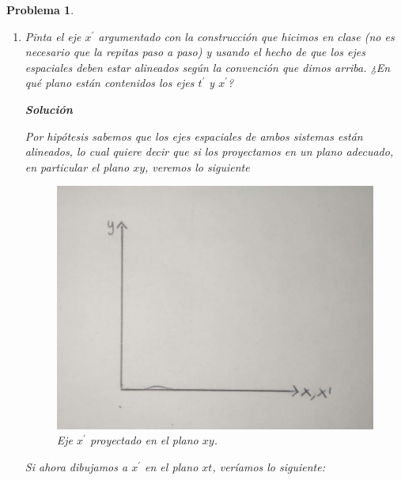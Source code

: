 \documentclass[12pt]{article}
\theoremstyle{break}
\newtheorem{exercise}{Problema}
\theoremstyle{nonumberbreak}
\newcommand*{\inlinesol}{\vspace*{10pt}\textbf{Solución}\vspace*{10pt}}
\begin{document}
\begin{exercise}
\begin{enumerate}[label = \alph*)]
            Notamos entonces que \(t^{\prime}\) se encuentra en el plano \(xy\). 

            \pagebreak
            \item Pinta el eje \(x^{\prime}\) argumentado con la construcción que hicimos en clase (no es necesario que la repitas paso a paso) y usando el hecho de que los ejes espaciales deben estar alineados según la convención que dimos arriba. ¿En qué plano están contenidos los ejes \(t^{\prime}\) y \(x^{\prime}\)?
            
            \inlinesol

            Por hipótesis sabemos que los ejes espaciales de ambos sistemas están alineados, lo cual quiere decir que si los proyectamos en un plano adecuado, en particular el plano \(xy\), veremos lo siguiente

            \begin{figure}[htb]
                \centering
                \includegraphics[scale = 0.2]{fig-6}
                \caption{Eje \(x^{\prime}\) proyectado en el plano \(xy\).}
                \label{fig:Xprime-Planext}
            \end{figure}

            \pagebreak
            Si ahora dibujamos a \(x^{\prime}\) en el plano \(xt\), veríamos lo siguiente:


\end{enumerate}
\end{exercise}
\end{document}
